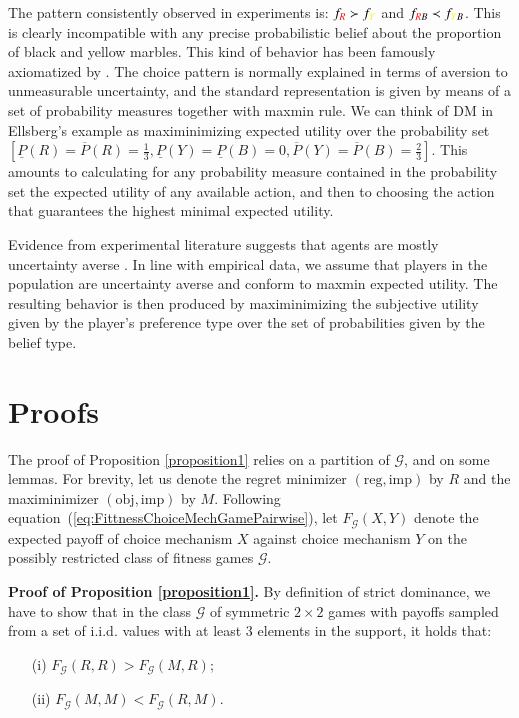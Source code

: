 \documentclass[fleqn,reqno,12pt]{article}
\theoremstyle{Satz}
\theoremstyle{Bsp}
\begin{document}
The pattern consistently observed in experiments is:
$f_{{\color{red}R}} \succ f_{{\color{yellow}Y}}$ and
$f_{{\color{red}R}B} \prec f_{{\color{yellow}Y}B}$. This is clearly incompatible with any
precise probabilistic belief about the proportion of black and yellow marbles. This kind of
behavior has been famously axiomatized by \citet{gilsch89}. The
choice pattern is normally explained in terms of aversion to unmeasurable uncertainty, and the standard
representation is given by means of a set of probability measures together with maxmin rule. We
can think of DM in Ellsberg's example as maximinimizing expected utility over the
probability set
$
[\underline{P}(R)=\overline{P}(R)=\frac{1}{3}, \underline{P}(Y)= \underline{P}(B)=0, \overline{P}(Y)= \overline{P}(B)=\frac{2}{3}]
$.
This amounts to calculating for any probability measure contained in the probability set the
expected utility of any available action, and then to choosing the action that guarantees the
highest minimal expected utility. 

Evidence from experimental literature suggests that agents are mostly uncertainty averse \citep[e.g.,][]{TrautKuil16}. In line with empirical data, we assume that players in the population
are uncertainty averse and conform to maxmin expected utility. The resulting behavior is then
produced by maximinimizing the subjective utility given by the player's preference type over
the set of probabilities given by the belief type.

\fi



\section{Proofs}
\label{sec:proofs}

The proof of Proposition \ref{proposition1} relies on a partition of $\mathcal{G}$, and on some
lemmas. For brevity, let us denote the regret minimizer $(\text{reg}, \text{imp})$ by $R$ and
the maximinimizer $(\text{obj}, \text{imp})$ by $M$. Following
equation~(\ref{eq:FittnessChoiceMechGamePairwise}), let $F_{\mathcal{G}}(X,Y)$ denote the
expected payoff of choice mechanism $X$ against choice mechanism $Y$ on the possibly restricted
class of fitness games $\mathcal{G}$.

\vspace{.5cm}


\noindent \textbf{Proof of Proposition \ref{proposition1}.} By definition of strict dominance,
we have to show that in the class $\mathcal{G}$ of symmetric $2\times2$ games with payoffs
sampled from a set of i.i.d. values with at least 3 elements in the support, it holds that:
\begin{multicols}{2}
  \begin{itemize}
  \item[(i)] $F_{\mathcal{G}}(R,R)>F_{\mathcal{G}}(M,R);$
  \item[(ii)] $F_{\mathcal{G}}(M,M)<F_{\mathcal{G}}(R,M).$
  \end{itemize}
\end{multicols}
\end{document}
